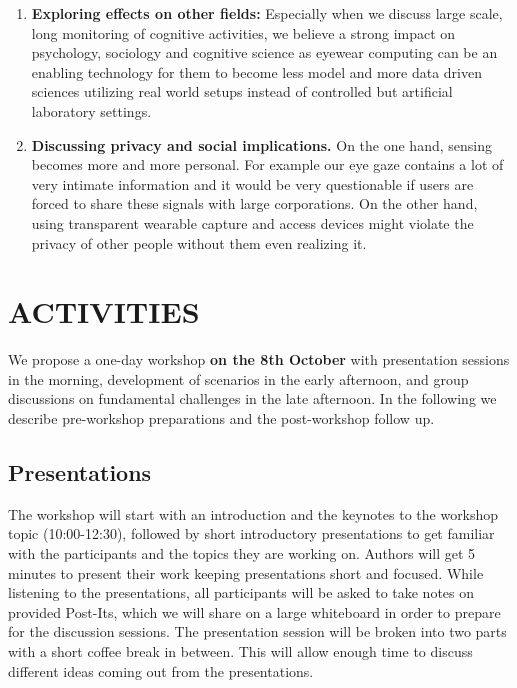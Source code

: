 \documentclass{sigchi-ext}
\begin{document}
\begin{enumerate}
  \item {\bf Exploring effects on other fields:} Especially when we discuss large scale, long monitoring of cognitive activities, we believe a strong impact on psychology, sociology and cognitive science as eyewear computing can be an enabling technology for them to  become less model and more data driven sciences utilizing real world setups instead of controlled but artificial laboratory settings.
  \item {\bf Discussing privacy and social implications.} On the one hand, sensing becomes more and more personal. For example our eye gaze contains a lot of very intimate information and it would be very questionable if users are forced to share these signals with large corporations. On the other hand, using transparent wearable capture and access devices might violate the privacy of other people without them even realizing it.

\end{enumerate}





\section{ACTIVITIES}

We propose a one-day workshop {\bf on the 8th October} with presentation sessions in the morning, development of scenarios in the early afternoon, and group discussions on fundamental challenges in the late afternoon. In the following we describe pre-workshop preparations and the post-workshop follow up.

\subsection{Presentations}
The workshop will start with an introduction and the keynotes to the workshop topic (10:00-12:30), followed by short introductory presentations to get familiar with the participants and the topics they are working on. Authors will get 5 minutes to present their work keeping presentations short and focused. While listening to the presentations, all participants will be asked to take notes on provided Post-Its, which we will share on a large whiteboard in order to prepare for the discussion sessions.
The presentation session will be broken into two parts with a short coffee break in between. This will allow enough time to discuss different ideas coming out from the presentations.
\end{document}

